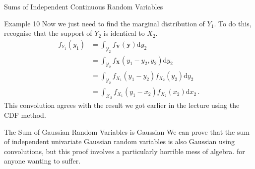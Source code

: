 \documentclass[10pt]{beamer}
\begin{document}
\begin{frame}[fragile]{Sums of Independent Continuous Random Variables}
\begin{exampleblock}{Example 10}
Now we just need to find the marginal distribution of \(Y_1\). To do this, recognise that the support of \(Y_2\) is identical to \(X_2\).
\begin{equation*}
    \begin{aligned}
        f_{Y_1}\left(y_1\right) &= \int_{\mathcal{Y}_2}f_{\bm{Y}}\left(\bm{y}\right)\mathrm{d}y_2\\
        &= \int_{\mathcal{Y}_2}f_{\bm{X}}\left(y_1 - y_2, y_2\right)\mathrm{d}y_2\\
        &= \int_{\mathcal{Y}_2}f_{X_1}\left(y_1 - y_2\right)f_{X_2}\left(y_2\right)\mathrm{d}y_2\\
        &= \int_{\mathcal{X}_2}f_{X_1}\left(y_1 - x_2\right)f_{X_2}\left(x_2\right)\mathrm{d}x_2\,.
    \end{aligned}
\end{equation*}
This convolution agrees with the result we got earlier in the lecture using the CDF method.
\end{exampleblock}
\end{frame}

\begin{frame}[fragile]{The Sum of Gaussian Random Variables is Gaussian}
We can prove that the sum of independent univariate Gaussian random variables is also Gaussian using convolutions, but this proof involves a particularly horrible mess of algebra. \href{https://en.wikipedia.org/wiki/Sum_of_normally_distributed_random_variables#Proof_using_convolutions}{\color{mLightBrown}{Here's the proof}} for anyone wanting to suffer.
\end{frame}
\end{document}
